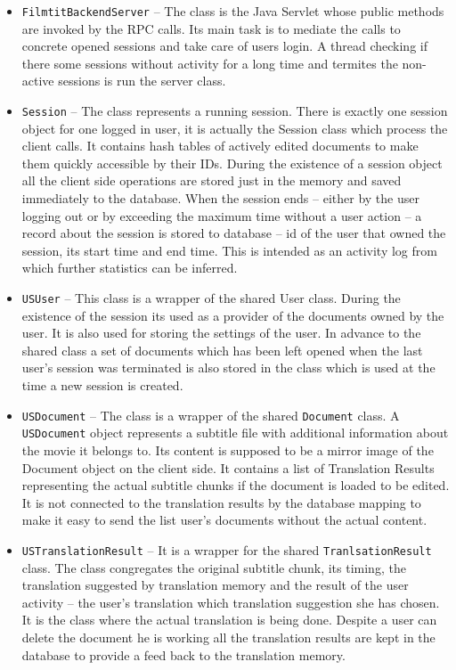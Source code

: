 \begin{itemize}
\item {\tt FilmtitBackendServer}  -- The class is the Java Servlet whose public methods are invoked by the RPC calls. Its main task is to mediate the calls to concrete opened sessions and take care of users login. A thread checking if there some sessions without activity for a long time and termites the non-active sessions is run the server class.

\item {\tt Session} -- The class represents a running session. There is exactly one session object for one logged in user, it is actually the Session class which process the client calls. It contains hash tables of actively edited documents to make them quickly accessible by their IDs. During the existence of a session object all the client side operations are stored just in the memory and saved immediately to the database. When the session ends -- either by the user logging out or by exceeding the maximum time without a user action -- a record about the session is stored to database -- id of the user that owned the session, its start time and end time. This is intended as an activity log from which further statistics can be inferred.

\item {\tt USUser} -- This class is a wrapper of the shared User class. During the existence of the session its used as a provider of the documents owned by the user. It is also used for storing the settings of the user. In advance to the shared class a set of documents which has been left opened when the last user's session was terminated is also stored in the class which is used at the time a new session is created. 

\item {\tt USDocument} -- The class is a wrapper of the shared {\tt Document} class. A {\tt USDocument} object represents a subtitle file with additional information about the movie it belongs to. Its content is supposed to be a mirror image of the Document object on the client side. It contains a list of Translation Results representing the actual subtitle chunks if the document is loaded to be edited. It is not connected to the translation results by the database mapping to make it easy to send the list user's documents without the actual content.

\item {\tt USTranslationResult} -- It is a wrapper for the shared {\tt TranlsationResult} class. The class congregates the original subtitle chunk, its timing, the translation suggested by translation memory and the result of the user activity -- the user's translation which translation suggestion she has chosen. It is the class where the actual translation is being done. Despite a user can delete the document he is working all the translation results are kept in the database to provide a  feed back to the translation memory.

\end{itemize}

